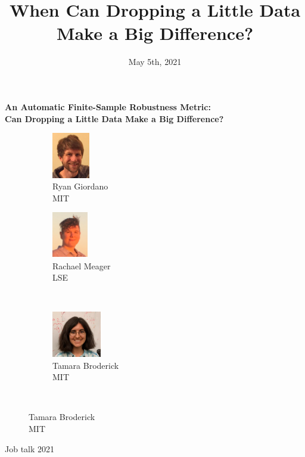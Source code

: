 \documentclass[10pt]{beamer}
\title{When Can Dropping a Little Data Make a Big Difference?}
\author{}
\date{May 5th, 2021}
\begin{document}

\begin{frame}

\begin{center}
\large
\textbf{
An Automatic Finite-Sample Robustness Metric:
\\Can Dropping a Little Data Make a Big Difference?}
\end{center}

\hrulefill

\begin{figure}
    \begin{subfigure}{0.32\textwidth}
        \centering
        \includegraphics[height=2cm]{collaborators/ryan}
        \caption*{Ryan Giordano \\ MIT}
    \end{subfigure}
    \begin{subfigure}{.32\textwidth}
        \centering
        \includegraphics[height=2cm]{collaborators/rachael}
    \captionsetup{justification=centering}
        \caption*{Rachael Meager \\ LSE}
    \end{subfigure}
    \vspace{0.11in}
\  		\begin{subfigure}{.32\textwidth}
        \centering
        \includegraphics[height=2cm]{collaborators/tamara}
        \caption*{Tamara Broderick \\ MIT}
    \end{subfigure}\\
\end{figure}
\hrulefill

Job talk 2021

\end{frame}
\end{document}
